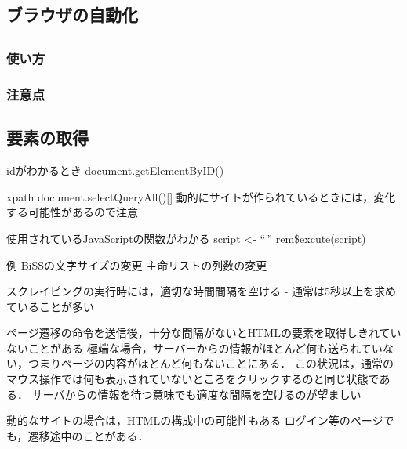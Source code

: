 \documentclass[
]{article}
\begin{document}
\hypertarget{ux30d6ux30e9ux30a6ux30b6ux306eux81eaux52d5ux5316}{%
\subsection{ブラウザの自動化}\label{ux30d6ux30e9ux30a6ux30b6ux306eux81eaux52d5ux5316}}

\hypertarget{section-2}{%
\subsection{}\label{section-2}}

\hypertarget{ux4f7fux3044ux65b9-5}{%
\subsubsection{使い方}\label{ux4f7fux3044ux65b9-5}}

\hypertarget{ux6ce8ux610fux70b9-5}{%
\subsubsection{注意点}\label{ux6ce8ux610fux70b9-5}}

\hypertarget{ux8981ux7d20ux306eux53d6ux5f97}{%
\subsection{要素の取得}\label{ux8981ux7d20ux306eux53d6ux5f97}}

idがわかるとき
document.getElementByID()

xpath
document.selectQueryAll(){[}{]}
動的にサイトが作られているときには，変化する可能性があるので注意

使用されているJavaScriptの関数がわかる
script \textless- ``\,''
rem\$excute(script)

例
BiSSの文字サイズの変更
主命リストの列数の変更

スクレイピングの実行時には，適切な時間間隔を空ける
- 通常は5秒以上を求めていることが多い

ページ遷移の命令を送信後，十分な間隔がないとHTMLの要素を取得しきれていないことがある
極端な場合，サーバーからの情報がほとんど何も送られていない，つまりページの内容がほとんど何もないことにある．
この状況は，通常のマウス操作では何も表示されていないところをクリックするのと同じ状態である．
サーバからの情報を待つ意味でも適度な間隔を空けるのが望ましい

動的なサイトの場合は，HTMLの構成中の可能性もある
ログイン等のページでも，遷移途中のことがある．
\end{document}
